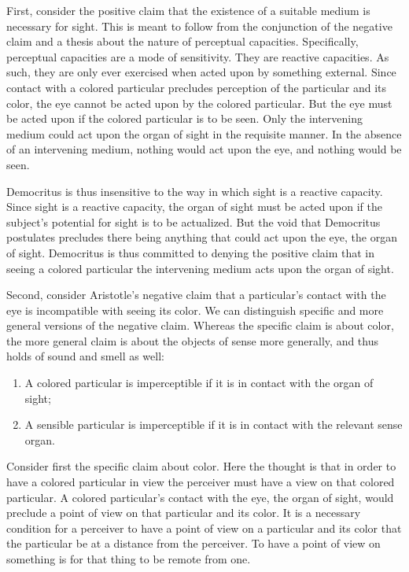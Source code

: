 First, consider the positive claim that the existence of a suitable medium is necessary for sight. This is meant to follow from the conjunction of the negative claim and a thesis about the nature of perceptual capacities. Specifically, perceptual capacities are a mode of sensitivity. They are reactive capacities. As such, they are only ever exercised when acted upon by something external. Since contact with a colored particular precludes perception of the particular and its color, the eye cannot be acted upon by the colored particular. But the eye must be acted upon if the colored particular is to be seen. Only the intervening medium could act upon the organ of sight in the requisite manner. In the absence of an intervening medium, nothing would act upon the eye, and nothing would be seen.

Democritus is thus insensitive to the way in which sight is a reactive capacity. Since sight is a reactive capacity, the organ of sight must be acted upon if the subject's potential for sight is to be actualized. But the void that Democritus postulates precludes there being anything that could act upon the eye, the organ of sight. Democritus is thus committed to denying the positive claim that in seeing a colored particular the intervening medium acts upon the organ of sight.

Second, consider Aristotle's negative claim that a particular's contact with the eye is incompatible with seeing its color.  We can distinguish specific and more general versions of the negative claim. Whereas the specific claim is about color, the more general claim is about the objects of sense more generally, and thus holds of sound and smell as well:
\begin{enumerate}[(1)]
	\item A colored particular is imperceptible if it is in contact with the organ of sight;
	\item A sensible particular is imperceptible if it is in contact with the relevant sense organ.
\end{enumerate}

Consider first the specific claim about color. Here the thought is that in order to have a colored particular in view the perceiver must have a view on that colored particular. A colored particular's contact with the eye, the organ of sight, would preclude a point of view on that particular and its color. It is a necessary condition for a perceiver to have a point of view on a particular and its color that the particular be at a distance from the perceiver. To have a point of view on something is for that thing to be remote from one.

